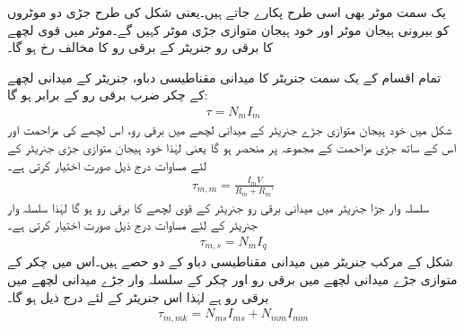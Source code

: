 یک سمت  موٹر بھی اسی طرح پکارے جاتے ہیں۔یعنی شکل   کی طرح جڑی دو موٹروں کو بیرونی ہیجان موٹر اور خود ہیجان متوازی جڑی موٹر کہیں گے۔موٹر میں قوی لچھے کا برقی رو جنریٹر کے برقی رو کا مخالف رخ ہو گا۔

تمام اقسام کے یک سمت  جنریٹر کا میدانی مقناطیسی دباو، جنریٹر کے میدانی لچھے کے چکر ضرب برقی رو کے برابر ہو گا:
\begin{align}\label{مساوات_یک_سمت_میدانی_دباو}
\tau=N_m I_m
\end{align}
شکل   میں خود ہیجان متوازی جڑے جنریٹر کے میدانی لچھے میں برقی رو، اس لچھے کی مزاحمت  اور اس کے ساتھ جڑی مزاحمت کے مجموعہ   پر منحصر ہو گا یعنی  لہٰذا خود ہیجان متوازی جڑی جنریٹر کے لئے  مساوات   درج ذیل  صورت اختیار کرتی ہے۔
\begin{align}
\tau_{m,m}=\frac{I_m V}{R_m+R_m'}
\end{align}
سلسلہ وار جڑا جنریٹر میں میدانی برقی رو جنریٹر کے قوی لچھے کا برقی رو ہو گا لہٰذا سلسلہ وار جنریٹر کے لئے مساوات  درج ذیل صورت اختیار کرتی ہے۔
\begin{align}
\tau_{m,s}=N_m I_q
\end{align}
شکل   کے مرکب جنریٹر میں میدانی مقناطیسی دباو کے دو حصے ہیں۔اس میں  چکر کے متوازی جڑے میدانی لچھے میں برقی رو   اور   چکر کے سلسلہ وار جڑے میدانی لچھے میں  برقی رو  ہے لہٰذا اس جنریٹر کے لئے درج ذیل ہو گا۔
\begin{align}
\tau_{m,mk}=N_{ms} I_{ms}+N_{mm} I_{mm}
\end{align}

